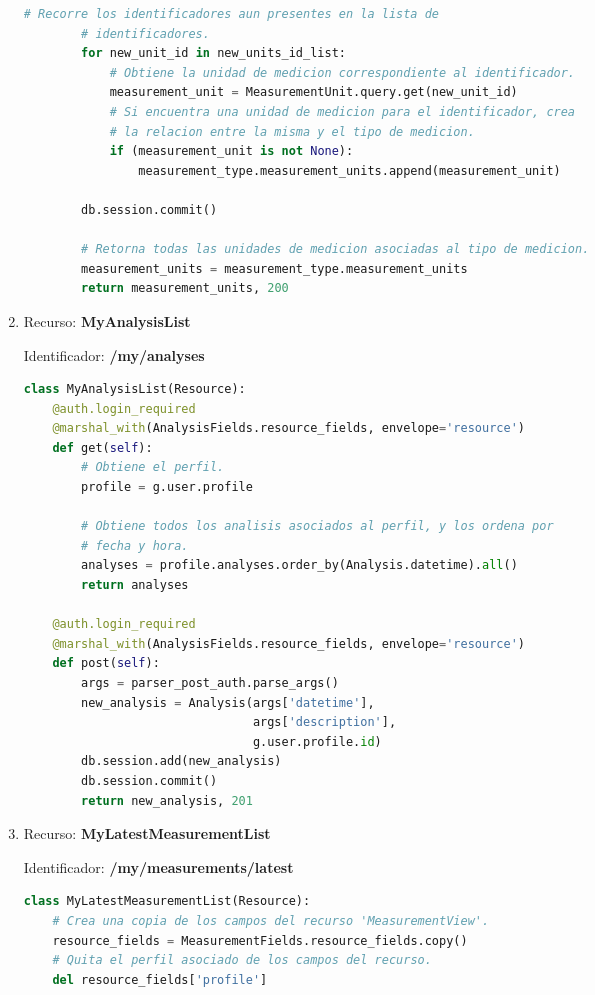 \begin{enumerate}
\begin{lstlisting}[language=Python]
        # Recorre los identificadores aun presentes en la lista de
        # identificadores.
        for new_unit_id in new_units_id_list:
            # Obtiene la unidad de medicion correspondiente al identificador.
            measurement_unit = MeasurementUnit.query.get(new_unit_id)
            # Si encuentra una unidad de medicion para el identificador, crea
            # la relacion entre la misma y el tipo de medicion.
            if (measurement_unit is not None):
                measurement_type.measurement_units.append(measurement_unit)

        db.session.commit()

        # Retorna todas las unidades de medicion asociadas al tipo de medicion.
        measurement_units = measurement_type.measurement_units
        return measurement_units, 200
\end{lstlisting}

\item Recurso: \textbf{MyAnalysisList}

Identificador: \textbf{/my/analyses}

\begin{lstlisting}[language=Python]
class MyAnalysisList(Resource):
    @auth.login_required
    @marshal_with(AnalysisFields.resource_fields, envelope='resource')
    def get(self):
        # Obtiene el perfil.
        profile = g.user.profile

        # Obtiene todos los analisis asociados al perfil, y los ordena por
        # fecha y hora.
        analyses = profile.analyses.order_by(Analysis.datetime).all()
        return analyses

    @auth.login_required
    @marshal_with(AnalysisFields.resource_fields, envelope='resource')
    def post(self):
        args = parser_post_auth.parse_args()
        new_analysis = Analysis(args['datetime'],
                                args['description'],
                                g.user.profile.id)
        db.session.add(new_analysis)
        db.session.commit()
        return new_analysis, 201
\end{lstlisting}

\item Recurso: \textbf{MyLatestMeasurementList}

Identificador: \textbf{/my/measurements/latest}

\begin{lstlisting}[language=Python]
class MyLatestMeasurementList(Resource):
    # Crea una copia de los campos del recurso 'MeasurementView'.
    resource_fields = MeasurementFields.resource_fields.copy()
    # Quita el perfil asociado de los campos del recurso.
    del resource_fields['profile']


\end{lstlisting}
\end{enumerate}
